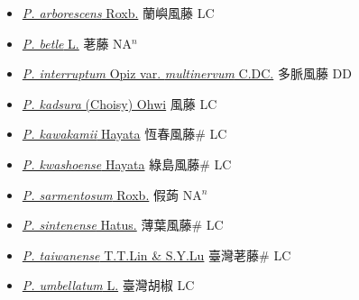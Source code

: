 \begin{itemize}
  \begin{itemize}
        \item[] \href{http://www.theplantlist.org/tpl1.1/search?q=Piper+arborescens}{\textit{P. arborescens} Roxb.}   蘭嶼風藤 LC
        \item[] \href{http://www.theplantlist.org/tpl1.1/search?q=Piper+betle}{\textit{P. betle} L.}   荖藤 NA$^n$
        \item[] \href{http://www.theplantlist.org/tpl1.1/search?q=Piper+interruptum+var.+multinervum}{\textit{P. interruptum} Opiz var. \textit{multinervum} C.DC.}   多脈風藤 DD
        \item[] \href{http://www.theplantlist.org/tpl1.1/search?q=Piper+kadsura}{\textit{P. kadsura} (Choisy) Ohwi}   風藤 LC
        \item[] \href{http://www.theplantlist.org/tpl1.1/search?q=Piper+kawakamii}{\textit{P. kawakamii} Hayata}   恆春風藤\# LC
        \item[] \href{http://www.theplantlist.org/tpl1.1/search?q=Piper+kwashoense}{\textit{P. kwashoense} Hayata}   綠島風藤\# LC
        \item[] \href{http://www.theplantlist.org/tpl1.1/search?q=Piper+sarmentosum}{\textit{P. sarmentosum} Roxb.}   假蒟 NA$^n$
        \item[] \href{http://www.theplantlist.org/tpl1.1/search?q=Piper+sintenense}{\textit{P. sintenense} Hatus.}   薄葉風藤\# LC
        \item[] \href{http://www.theplantlist.org/tpl1.1/search?q=Piper+taiwanense}{\textit{P. taiwanense} T.T.Lin \& S.Y.Lu}   臺灣荖藤\# LC
        \item[] \href{http://www.theplantlist.org/tpl1.1/search?q=Piper+umbellatum}{\textit{P. umbellatum} L.}   臺灣胡椒 LC
  \end{itemize}
  \end{itemize}
